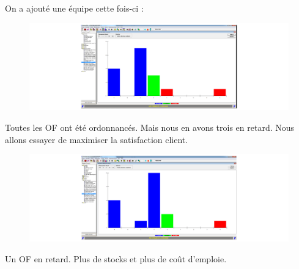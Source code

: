 \documentclass{scrreprt}
\begin{document}
On a ajouté une équipe cette fois-ci : 

\begin{figure}
   \begin{minipage}[c]{.46\linewidth}
      \includegraphics[scale=0.3]{1equipeenplus.png}
   \end{minipage} \hfill
\end{figure}

Toutes les OF ont été ordonnancés. Mais nous en avons trois en retard. Nous allons essayer de maximiser la satisfaction client. 

\begin{figure}
   \begin{minipage}[c]{.46\linewidth}
      \includegraphics[scale=0.3]{2equipeenplus.png}
   \end{minipage} \hfill
\end{figure}


Un OF en retard.
Plus de stocks et plus de coût d'emploie. 
\end{document}
